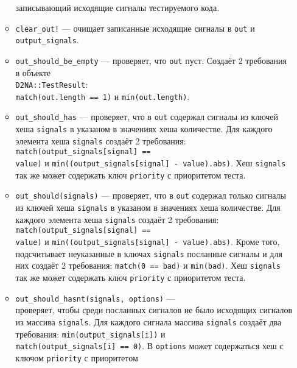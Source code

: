 \documentclass[utf8,a5paper,portrait,10pt]{eskdtext}
\begin{document}
\begin{itemize}
\begin{itemize}
                записывающий исходящие сигналы тестируемого кода.
          \item \texttt{clear\_out!} — очищает записанные исходящие сигналы в
                \texttt{out} и \texttt{output\_signals}.
          \item \texttt{out\_should\_be\_empty} — проверяет, что \texttt{out}
                пуст. Создаёт 2 требования в объекте\\
                \texttt{D2NA::TestResult}:\\ \texttt{match(out.length == 1)} и
                \texttt{min(out.length)}.
          \item \texttt{out\_should\_has} —  проверяет, что в \texttt{out}
                содержал сигналы из ключей хеша \texttt{signals} в указаном в
                значениях хеша количестве. Для каждого элемента хеша
                \texttt{signals} создаёт 2 требования:
                \texttt{match(output\_signals[signal] ==\\ value)} и
                \texttt{min((output\_signals[signal] - value).abs)}. Хеш
                \texttt{signals} так же может содержать ключ \texttt{priority} с
                приоритетом теста.
          \item \texttt{out\_should(signals)} — проверяет, что в \texttt{out}
                содержал только сигналы из ключей хеша \texttt{signals} в
                указаном в значениях хеша количестве. Для каждого элемента
                хеша \texttt{signals} создаёт 2 требования:
                \texttt{match(output\_signals[signal] ==\\ value)} и
                \texttt{min((output\_signals[signal] - value).abs)}. Кроме того,
                подсчитывает неуказанные в ключах \texttt{signals} посланные
                сигналы и для них создаёт 2 требования: \texttt{match(0 == bad)}
                и \texttt{min(bad)}. Хеш \texttt{signals} так же может содержать
                ключ \texttt{priority} с приоритетом теста.
          \item \texttt{out\_should\_hasnt(signals, options)} —\\ проверяет,
                чтобы среди посланных сигналов не было исходящих сигналов из
                массива \texttt{signals}. Для каждого сигнала массива
                \texttt{signals} создаёт два требования:
                \texttt{min(output\_signals[i])} и\\
                \texttt{match(output\_signals[i] == 0)}. В \texttt{options}
                может содержаться хеш с ключом \texttt{priority} с приоритетом

\end{itemize}
\end{itemize}
\end{document}

